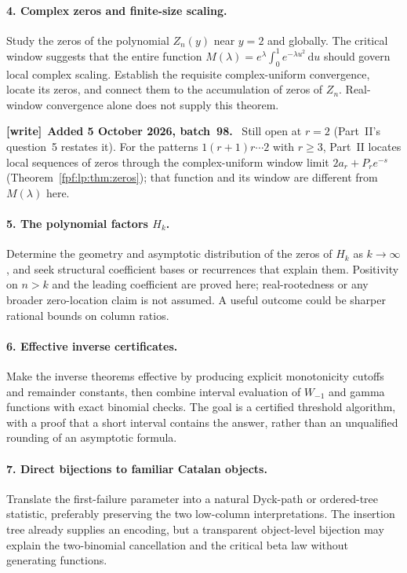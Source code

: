 \documentclass[11pt]{article}
\numberwithin{equation}{section}
\theoremstyle{definition}
\newcommand{\dd}{\mathrm d}
\newenvironment{writenote}[1][]{\par\smallskip\begingroup\small
 \noindent\textbf{[write]}\if\relax\detokenize{#1}\relax\else~\textbf{#1.}\fi\ }%
 {\par\endgroup\smallskip}
\begin{document}
\paragraph{4. Complex zeros and finite-size scaling.}
Study the zeros of the polynomial $Z_n(y)$ near $y=2$ and globally.
The critical window suggests that the entire function
$M(\lambda)=e^\lambda\int_0^1e^{-\lambda u^2}\,\dd u$ should govern local
complex scaling. Establish the requisite complex-uniform convergence,
locate its zeros, and connect them to the accumulation of zeros of $Z_n$.
Real-window convergence alone does not supply this theorem.

\begin{writenote}[Added 5 October 2026, batch~98]
Still open at $r=2$ (Part~II's question~5 restates it). For the patterns
$1(r+1)r\cdots2$ with $r\ge3$, Part~II locates local sequences of zeros
through the complex-uniform window limit $2a_r+P_re^{-s}$
(Theorem~\ref{fpf:lp:thm:zeros}); that function and its window are
different from $M(\lambda)$ here.
\end{writenote}

\paragraph{5. The polynomial factors $H_k$.}
Determine the geometry and asymptotic distribution of the zeros of $H_k$
as $k\to\infty$, and seek structural coefficient bases or recurrences
that explain them. Positivity on $n>k$ and the leading coefficient are
proved here; real-rootedness or any broader zero-location claim is not
assumed. A useful outcome could be sharper rational bounds on column
ratios.

\paragraph{6. Effective inverse certificates.}
Make the inverse theorems effective by producing explicit monotonicity
cutoffs and remainder constants, then combine interval evaluation of
$W_{-1}$ and gamma functions with exact binomial checks. The goal is a
certified threshold algorithm, with a proof that a short interval contains
the answer, rather than an unqualified rounding of an asymptotic formula.

\paragraph{7. Direct bijections to familiar Catalan objects.}
Translate the first-failure parameter into a natural Dyck-path or ordered-tree
statistic, preferably preserving the two low-column interpretations.
The insertion tree already supplies an encoding, but a transparent
object-level bijection may explain the two-binomial cancellation and the
critical beta law without generating functions.
\end{document}
